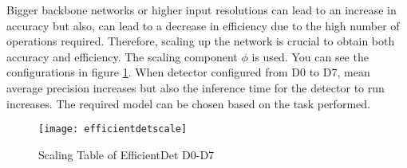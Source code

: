 \documentclass{article}
\begin{document}
Bigger backbone networks or higher input resolutions can lead to an increase 
in accuracy but also, can lead to a decrease in efficiency due to the high 
number of operations required. Therefore, scaling up the network is crucial 
to obtain both accuracy and efficiency. The scaling component $\phi$ is used. 
You can see the configurations in figure \ref{fig:efficientdetscale1}. 
When detector configured from D0 to D7, mean average precision increases but 
also the inference time for the detector to run increases. The required model 
can be chosen based on the task performed. 

\begin{figure}
    \centering
    \texttt{[image: efficientdetscale]}
    \caption{Scaling Table of EfficientDet D0-D7 \cite{efficientdetcite}}
    \label{fig:efficientdetscale1}
\end{figure}
\end{document}
